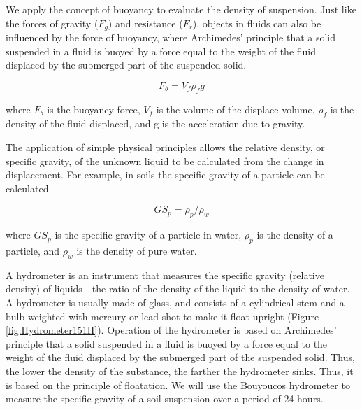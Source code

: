 \documentclass{tufte-handout}
\begin{document}
We apply the concept of buoyancy to evaluate the density of suspension. Just like the forces of gravity ($F_g$) and resistance ($F_r$), objects in fluids can also be influenced by the force of buoyancy, where Archimedes' principle that a solid suspended in a fluid is buoyed by a force equal to the weight of the fluid displaced by the submerged part of the suspended solid. 

\begin{equation}
F_b = V_f \rho_f g
\end{equation}

\noindent where $F_b$ is the buoyancy force, $V_f$ is the volume of the displace volume, $\rho_f$ is the density of the fluid displaced, and g is the acceleration due to gravity.

The application of simple physical principles allows the relative density, or specific gravity, of the unknown liquid to be calculated from the change in displacement. For example, in soils the specific gravity of a particle can be calculated 

\begin{equation}
GS_p = \rho_p / \rho_w
\end{equation}

\noindent where $GS_p$ is the specific gravity of a particle in water, 
$\rho_p$ is the density of a particle, and
$\rho_w$ is the density of pure water.



A hydrometer is an instrument that measures the specific gravity (relative density) of liquids---the ratio of the density of the liquid to the density of water. A hydrometer is usually made of glass, and consists of a cylindrical stem and a bulb weighted with mercury or lead shot to make it float upright (Figure \ref{fig:Hydrometer151H}). Operation of the hydrometer is based on Archimedes' principle that a solid suspended in a fluid is buoyed by a force equal to the weight of the fluid displaced by the submerged part of the suspended solid. Thus, the lower the density of the substance, the farther the hydrometer sinks. Thus, it is based on the principle of floatation. We will use the Bouyoucos hydrometer to measure the specific gravity of a soil suspension over a period of 24 hours. 
\end{document}
